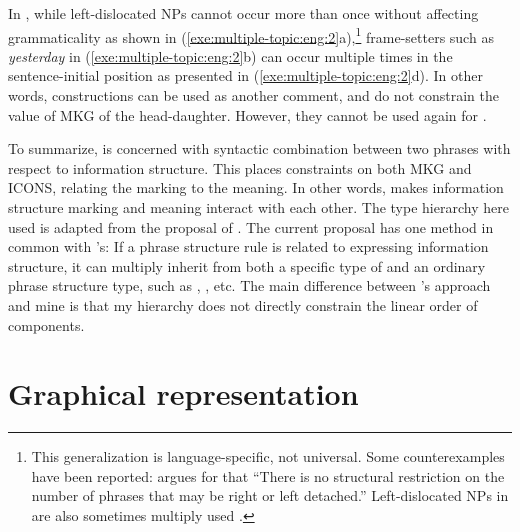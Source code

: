 In , while left-dislocated NPs cannot occur more than
once without affecting grammaticality as shown in
(\ref{exe:multiple-topic:eng:2}a),\footnote{This generalization is
  language-specific, not universal.  Some counterexamples have been
  reported: \citet[123]{vallduvi:93} argues for  that
  ``There is no structural restriction on the number of phrases that
  may be right or left detached.''  Left-dislocated NPs in
   are also sometimes multiply used
  \citep[224]{zagona:02}.}  frame-setters such as
\textit{yesterday} in (\ref{exe:multiple-topic:eng:2}b) can occur
multiple times in the sentence-initial position as presented in
(\ref{exe:multiple-topic:eng:2}d). In other words,
 constructions can be used as another comment, and
do not constrain the value of MKG of the head-daughter.
However, they cannot be used again for .

 



To summarize,   is concerned with
syntactic combination between two phrases with respect to information
structure.  This places constraints on both MKG and ICONS, relating
the marking to the meaning. In other words,  makes
information structure marking and meaning interact with each other.
The type hierarchy here used is adapted from the proposal of
\citet{paggio:09}. The current proposal has one method in common with
\citeauthor{paggio:09}'s: If a phrase structure rule is related to
expressing information structure, it can multiply inherit from both a
specific type of  and an ordinary phrase structure type,
such as , , etc. The main
difference between \citeauthor{paggio:09}'s approach and mine is that
my  hierarchy does not directly constrain the linear order
of components.


\newpage 
\section{Graphical representation}
\label{9:sec:graph}


